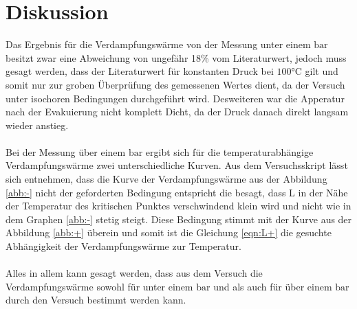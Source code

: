 \section{Diskussion}
\label{sec:Diskussion}
Das Ergebnis für die Verdampfungswärme von
der Messung unter einem $\si{\bar}$ besitzt
zwar eine Abweichung von ungefähr
18\% vom Literaturwert, jedoch muss gesagt werden, dass
der Literaturwert für konstanten Druck bei $100\si{\degreeCelsius}$
gilt und somit nur zur groben Überprüfung des gemessenen Wertes dient,
da der Versuch unter isochoren Bedingungen durchgeführt wird.
Desweiteren war die Apperatur nach der Evakuierung nicht komplett Dicht,
da der Druck danach direkt langsam wieder anstieg.\\
\\
Bei der Messung über einem $\si{\bar}$ ergibt sich für die
temperaturabhängige Verdampfungswärme zwei unterschiedliche
Kurven. Aus dem Versuchsskript\cite{sample} lässt sich entnehmen, dass
die Kurve der Verdampfungswärme aus der Abbildung \ref{abb:-} nicht der
geforderten Bedingung entspricht die besagt, dass L in der Nähe der
Temperatur des kritischen Punktes verschwindend klein wird und nicht
wie in dem Graphen \ref{abb:-} stetig steigt.
Diese Bedingung stimmt mit der Kurve aus der Abbildung \ref{abb:+} überein
und somit ist die Gleichung \eqref{eqn:L+}
die gesuchte Abhängigkeit der Verdampfungswärme zur Temperatur.\\
\\
Alles in allem kann gesagt werden, dass aus dem Versuch die Verdampfungswärme
sowohl für unter einem $\si{\bar}$ und als auch für über einem $\si{\bar}$
durch den Versuch bestimmt werden kann.
